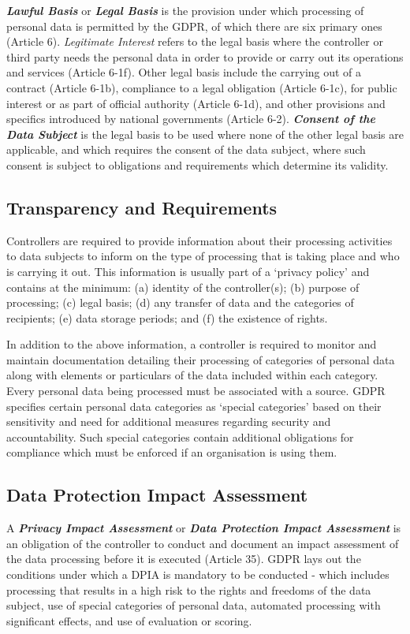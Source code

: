 \textit{\textbf{Lawful Basis}} or \textit{\textbf{Legal Basis}} is the provision under which processing of personal data is permitted by the GDPR, of which there are six primary ones (Article 6). \textit{Legitimate Interest} refers to the legal basis where the controller or third party needs the personal data in order to provide or carry out its operations and services (Article 6-1f). Other legal basis include the carrying out of a contract (Article 6-1b), compliance to a legal obligation (Article 6-1c), for public interest or as part of official authority (Article 6-1d), and other provisions and specifics introduced by national governments (Article 6-2).
\textit{\textbf{Consent of the Data Subject}} is the legal basis to be used where none of the other legal basis are applicable, and which requires the consent of the data subject, where such consent is subject to obligations and requirements which determine its validity.

\subsection{Transparency and Requirements}
Controllers are required to provide information about their processing activities to data subjects to inform on the type of processing that is taking place and who is carrying it out.
This information is usually part of a `privacy policy' and contains at the minimum: (a) identity of the controller(s); (b) purpose of processing; (c) legal basis; (d) any transfer of data and the categories of recipients; (e) data storage periods; and (f) the existence of rights.

In addition to the above information, a controller is required to monitor and maintain documentation detailing their processing of categories of personal data along with elements or particulars of the data included within each category. Every personal data being processed must be associated with a source. GDPR specifies certain personal data categories as `special categories' based on their sensitivity and need for additional measures regarding security and accountability. Such special categories contain additional obligations for compliance which must be enforced if an organisation is using them. 

\subsection{Data Protection Impact Assessment}
A \textit{\textbf{Privacy Impact Assessment}} or \textit{\textbf{Data Protection Impact Assessment}} is an obligation of the controller to conduct and document an impact assessment of the data processing before it is executed (Article 35). GDPR lays out the conditions under which a DPIA is mandatory to be conducted - which includes processing that results in a high risk to the rights and freedoms of the data subject, use of special categories of personal data, automated processing with significant effects, and use of evaluation or scoring.

